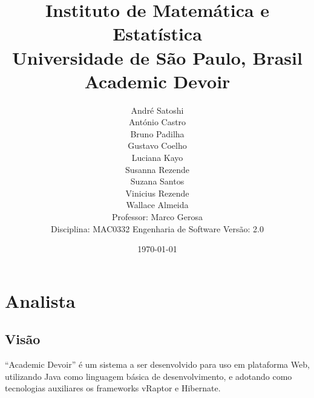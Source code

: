 \documentclass[12pt,letterpaper]{article}
\begin{document}
\sloppy

\title{
{\Large Instituto de Matemática e Estatística} \\
{\large Universidade de S\~ao Paulo, Brasil} \\
\vspace{2cm}
{\bf Academic Devoir}
}


\author{
André Satoshi\\
António Castro\\
Bruno Padilha\\
Gustavo Coelho\\
Luciana Kayo\\
Susanna Rezende\\
Suzana Santos\\
Vinicius Rezende\\
\vspace{2cm}
Wallace Almeida\\
{\small Professor: Marco Gerosa}\\
{\small Disciplina: MAC0332 Engenharia de Software}
\vspace{2cm}
{\small Versão: 2.0}
}

\date{\today}

\maketitle

\thispagestyle{empty}


\pagebreak

\tableofcontents






\pagebreak
\section{Analista}

\subsection{Visão}
``Academic Devoir'' é um sistema a ser desenvolvido para uso em plataforma Web,  utilizando Java como linguagem básica de desenvolvimento, e adotando como tecnologias au\-xi\-liares os frameworks vRaptor e Hibernate.
\end{document}
